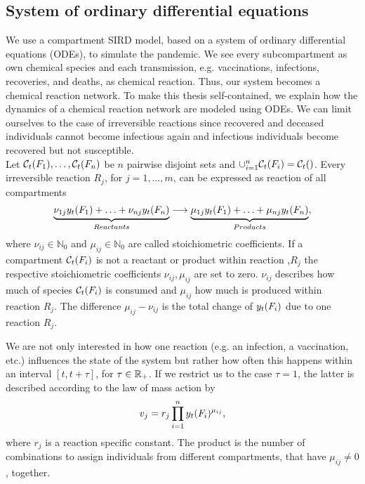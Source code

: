 \subsection{System of ordinary differential equations}
We use a compartment SIRD model, based on a system of ordinary differential equations (ODEs), to simulate the pandemic. We see every subcompartment as own chemical species and each transmission, e.g. vaccinations, infections, recoveries, and deaths, as chemical reaction. Thus, our system becomes a chemical reaction network. To make this thesis self-contained, we explain how the dynamics of a chemical reaction network are modeled using ODEs. We can limit ourselves to the case of irreversible reactions since recovered and deceased individuals cannot become infectious again and infectious individuals become recovered but not susceptible. \\

Let $\mathcal{C}_t(F_1), \dots, \mathcal{C}_t(F_n)$ be $n$ pairwise disjoint sets and $\cup_{i=1}^n \mathcal{C}_t(F_i) = \mathcal{C}_t()$. Every irreversible reaction $R_j$, for $j = 1, \dots, m$, can be expressed as reaction of all compartments
\begin{align}
\underbrace{\nu_{1j} y_t(F_1) + \hdots + \nu_{nj} y_t(F_n)}_{Reactants} \longrightarrow \underbrace{\mu_{1j} y_t(F_1) + \hdots + \mu_{nj} y_t(F_n)}_{Products},
\end{align}
where $\nu_{ij} \in \mathbb{N}_0$ and $\mu_{ij} \in \mathbb{N}_0$ are called stoichiometric coefficients.  If a compartment $\mathcal{C}_t(F_i)$ is not a reactant or product within reaction ,$R_j$ the respective stoichiometric coefficients $\nu_{ij}, \mu_{ij}$ are set to zero. $\nu_{ij}$ describes how much of species $\mathcal{C}_t(F_i)$ is consumed and $\mu_{ij}$ how much is produced within reaction $R_j$. The difference $\mu_{ij} - \nu_{ij}$ is the total change of $y_t(F_i)$ due to one reaction $R_j$.

We are not only interested in how one reaction (e.g. an infection, a vaccination, etc.) influences the state of the system but rather how often this happens within an interval $[t, t+\tau]$, for $\tau \in \mathbb{R}_+$. If we restrict us to the case $\tau = 1$, the latter is described according to the law of mass action by
\begin{align}
\label{eq:change_one_unit}
v_j = r_j  \prod_{i=1}^n y_t(F_i)^{\mu_{ij}},
\end{align}
where $r_j$ is a reaction specific constant. The product is the number of combinations to assign individuals from different compartments, that have $\mu_{ij} \neq 0$, together.

